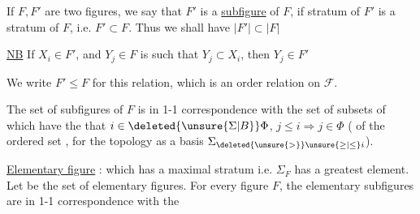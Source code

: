 If $F,F'$ are two figures, we say that $F'$ is a \uline{subfigure} of $F$, if  stratum of $F'$ is a stratum of $F$, i.e. $F'\subset F$. Thus  we shall have   $\lvert F'\rvert\subset\lvert F\rvert$

\uline{NB} If $X_i\in F'$, and $Y_j\in F$ is such that $Y_j\subset X_i$, then $Y_j\in F'$



We write $F'\leq F$ for this relation, which is an order relation on $\mathcal{F}$.

The set of subfigures of $F$ is in 1-1 correspondence with the set of subsets  of   which have the  that  $i\in\deleted{\unsure{\Sigma|B}}\Phi$, $j\leq i\Rightarrow j\in\Phi$
(   of the ordered set , for the topology   as a basis    $\Sigma_{\deleted{\unsure{>}}\unsure{\geq|\leq}i}$).


\uline{Elementary figure} : which has a maximal stratum i.e. $\Sigma_F$ has a greatest element. Let  be the set of elementary figures.  For every figure $F$, the elementary subfigures are in 1-1 correspondence with the
